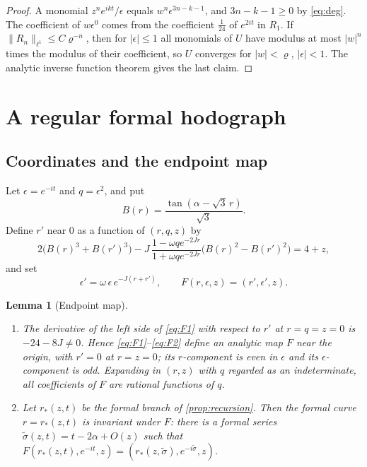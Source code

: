 \documentclass[11pt]{amsart}
\numberwithin{equation}{section}
\newtheorem{lemma}[theorem]{Lemma}
\theoremstyle{definition}
\theoremstyle{remark}
\newcommand{\abs}[1]{\lvert #1\rvert}
\newcommand{\norm}[1]{\lVert #1\rVert}
\begin{document}
\begin{proof}
A monomial $z^ne^{ikt}/\epsilon$ equals $w^n\epsilon^{3n-k-1}$, and $3n-k-1\ge0$ by \eqref{eq:deg}. The coefficient of $w\epsilon^0$ comes from the coefficient $\frac1{24}$ of $e^{2it}$ in $R_1$. If $\norm{R_n}_{\ell^1}\le C\varrho^{-n}$, then for $\abs\epsilon\le1$ all monomials of $U$ have modulus at most $\abs w^n$ times the modulus of their coefficient, so $U$ converges for $\abs w<\varrho$, $\abs\epsilon<1$. The analytic inverse function theorem gives the last claim.
\end{proof}

\section{A regular formal hodograph}\label{sec:hodograph}

\subsection{Coordinates and the endpoint map}\label{sec:endpoint}
Let $\epsilon=e^{-it}$ and $q=\epsilon^2$, and put
\[
B(r)=\frac{\tan(\alpha-\sqrt3\,r)}{\sqrt3}.
\]
Define $r'$ near $0$ as a function of $(r,q,z)$ by
\begin{equation}\label{eq:F1}
2\bigl(B(r)^3+B(r')^3\bigr)-J\,\frac{1-\omega qe^{-2Jr}}{1+\omega qe^{-2Jr}}\bigl(B(r)^2-B(r')^2\bigr)=4+z,
\end{equation}
and set
\begin{equation}\label{eq:F2}
\epsilon'=\omega\,\epsilon\,e^{-J(r+r')},\qquad F(r,\epsilon,z)=(r',\epsilon',z).
\end{equation}

\begin{lemma}[Endpoint map]\label{lem:endpoint}
\begin{enumerate}[label=\textup{(\alph*)}]
\item The derivative of the left side of \eqref{eq:F1} with respect to $r'$ at $r=q=z=0$ is $-24-8J\ne0$. Hence \eqref{eq:F1}--\eqref{eq:F2} define an analytic map $F$ near the origin, with $r'=0$ at $r=z=0$; its $r$-component is even in $\epsilon$ and its $\epsilon$-component is odd. Expanding in $(r,z)$ with $q$ regarded as an indeterminate, all coefficients of $F$ are rational functions of $q$.
\item Let $r_*(z,t)$ be the formal branch of \cref{prop:recursion}. Then the formal curve $r=r_*(z,t)$ is invariant under $F$: there is a formal series $\tilde\sigma(z,t)=t-2\alpha+O(z)$ such that $F(r_*(z,t),e^{-it},z)=(r_*(z,\tilde\sigma),e^{-i\tilde\sigma},z)$.
\end{enumerate}
\end{lemma}
\end{document}
